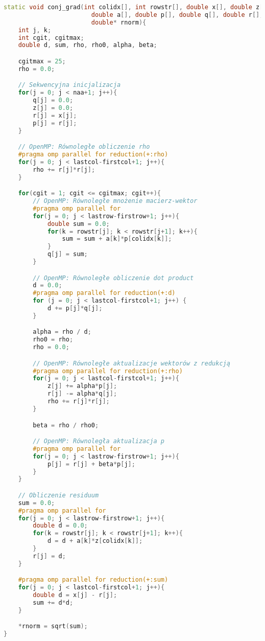 \begin{lstlisting}[language=C++, caption={Implementacja benchmarku CG w języku C++ z OpenMP}, label={lst:cg_openmp}]
static void conj_grad(int colidx[], int rowstr[], double x[], double z[], 
                        double a[], double p[], double q[], double r[], 
                        double* rnorm){
    int j, k;
    int cgit, cgitmax;
    double d, sum, rho, rho0, alpha, beta;

    cgitmax = 25;
    rho = 0.0;

    // Sekwencyjna inicjalizacja
    for(j = 0; j < naa+1; j++){
        q[j] = 0.0;
        z[j] = 0.0;
        r[j] = x[j];
        p[j] = r[j];
    }

    // OpenMP: Równoległe obliczenie rho
    #pragma omp parallel for reduction(+:rho)
    for(j = 0; j < lastcol-firstcol+1; j++){
        rho += r[j]*r[j];
    }

    for(cgit = 1; cgit <= cgitmax; cgit++){
        // OpenMP: Równoległe mnożenie macierz-wektor
        #pragma omp parallel for
        for(j = 0; j < lastrow-firstrow+1; j++){
            double sum = 0.0;
            for(k = rowstr[j]; k < rowstr[j+1]; k++){
                sum = sum + a[k]*p[colidx[k]];
            }
            q[j] = sum;
        }

        // OpenMP: Równoległe obliczenie dot product
        d = 0.0;
        #pragma omp parallel for reduction(+:d)
        for (j = 0; j < lastcol-firstcol+1; j++) {
            d += p[j]*q[j];
        }

        alpha = rho / d;
        rho0 = rho;
        rho = 0.0;

        // OpenMP: Równoległe aktualizacje wektorów z redukcją
        #pragma omp parallel for reduction(+:rho)
        for(j = 0; j < lastcol-firstcol+1; j++){
            z[j] += alpha*p[j];
            r[j] -= alpha*q[j];
            rho += r[j]*r[j];
        }

        beta = rho / rho0;

        // OpenMP: Równoległa aktualizacja p
        #pragma omp parallel for
        for(j = 0; j < lastrow-firstrow+1; j++){
            p[j] = r[j] + beta*p[j];
        }
    }

    // Obliczenie residuum
    sum = 0.0;
    #pragma omp parallel for
    for(j = 0; j < lastrow-firstrow+1; j++){
        double d = 0.0;
        for(k = rowstr[j]; k < rowstr[j+1]; k++){
            d = d + a[k]*z[colidx[k]];
        }
        r[j] = d;
    }

    #pragma omp parallel for reduction(+:sum)
    for(j = 0; j < lastcol-firstcol+1; j++){
        double d = x[j] - r[j];
        sum += d*d;
    }

    *rnorm = sqrt(sum);
}
\end{lstlisting}

